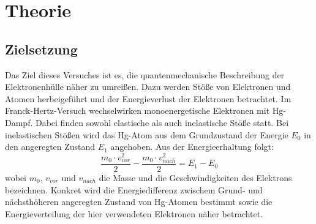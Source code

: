 \section{Theorie}
\label{sec:Theorie}

\subsection{Zielsetzung}
    Das Ziel dieses Versuches ist es, die quantenmechanische Beschreibung der Elektronenhülle
    näher zu umreißen. Dazu werden Stöße von Elektronen und Atomen herbeigeführt und
    der Energieverlust der Elektronen betrachtet. Im Franck-Hertz-Versuch wechselwirken
    monoenergetische Elektronen mit Hg-Dampf. Dabei finden sowohl elastische als auch inelastische
    Stöße statt. Bei inelastischen Stößen wird das Hg-Atom aus dem Grundzustand der Energie $E_0$ 
    in den angeregten Zustand $E_1$ angehoben. Aus der Energieerhaltung folgt:
    \begin{equation}
        \dfrac{m_0\cdot v_{vor}^2}{2}-\dfrac{m_0\cdot v_{nach}^2}{2}=E_1-E_0
    \end{equation}
    wobei $m_0$, $v_{vor}$ und $v_{nach}$ die Masse und die Geschwindigkeiten des Elektrons
    bezeichnen. Konkret wird die Energiedifferenz zwischem
    Grund- und nächsthöheren angeregten Zustand von Hg-Atomen bestimmt sowie die Energieverteilung
    der hier verwendeten Elektronen näher betrachtet. 

